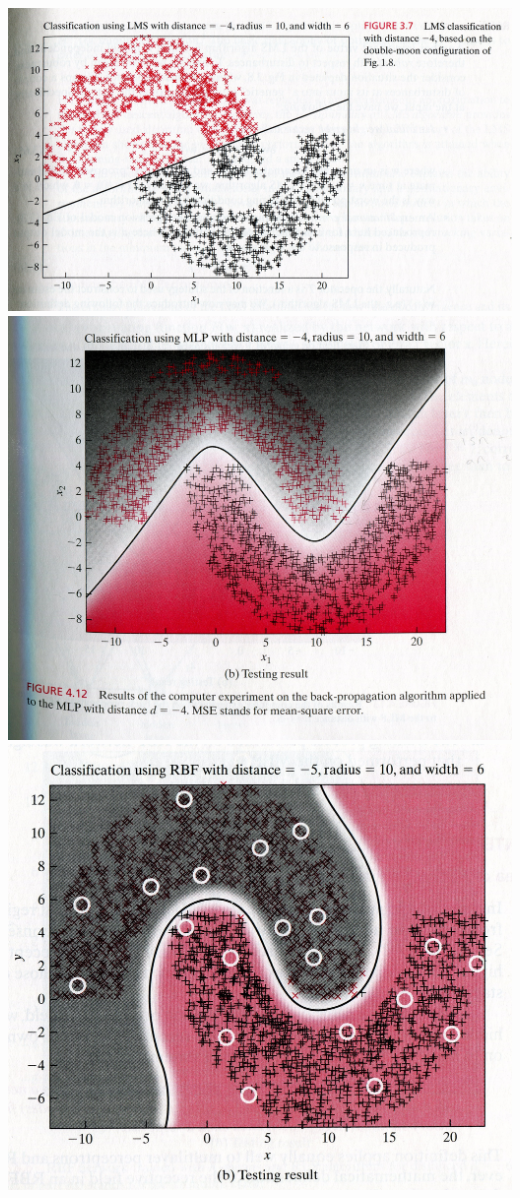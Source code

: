 \begin{enumerate}
\begin{solution}
    \begin{center}
      \includegraphics[width=0.7\linewidth]{ex07_04_lms.jpg}
      \\
      \includegraphics[width=0.7\linewidth]{ex07_04_mlp1.jpg}
      \\
      \includegraphics[width=0.7\linewidth]{ex07_04_rbf1.jpg}
    \end{center}
  \end{solution}
  


\end{enumerate}
